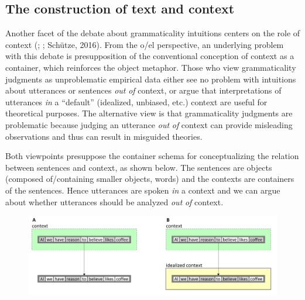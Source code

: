 \subsection{The construction of text and context}

Another facet of the debate about grammaticality intuitions centers on the role of context (\citealt{Bolinger1965}; \citealt{Keller2000}; Schütze, 2016). From the o/el perspective, an underlying problem with this debate is presupposition of the conventional conception of context as a container, which reinforces the object metaphor. Those who view grammaticality judgments as unproblematic empirical data either  see no problem with intuitions about utterances or sentences \textit{out} \textit{of} context, or  argue that interpretations of utterances \textit{in} a “default” (idealized, unbiased, etc.) context are useful for theoretical purposes. The alternative view is that grammaticality judgments are problematic because judging an utterance \textit{out} \textit{of} context can provide misleading observations and thus can result in misguided theories.

  Both viewpoints presuppose the container schema for conceptualizing the relation between sentences and context, as shown below. The sentences are objects (composed of/containing smaller objects, words) and the contexts are containers of the sentences. Hence utterances are spoken \textit{in} a context and we can argue about whether utterances should be analyzed \textit{out} \textit{of} context.   

  
\begin{figure}
\includegraphics[width=\textwidth]{figures/Tilsen-img120.png}
\caption{\missingcaption}
\label{fig:}
\end{figure}
 

